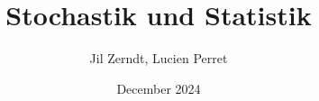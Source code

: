 \documentclass[a4paper, fontsize = 8pt, landscape]{scrartcl}
\title{Stochastik und Statistik}
\author{Jil Zerndt, Lucien Perret}
\date{December 2024}
\begin{document}
\begin{multicols}{3}
	\thispagestyle{TitlePageStyle}
	\maketitle
	
	\raggedcolumns
	
	\raggedcolumns
	
	\raggedcolumns
	
	\raggedcolumns
	
	\raggedcolumns
	
	\raggedcolumns
	
	\raggedcolumns
	\pagebreak
	\raggedcolumns
\end{multicols}
\end{document}
